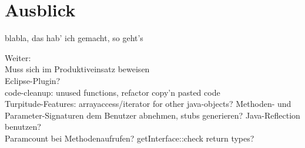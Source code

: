 \chapter{Ausblick}
\label{sec:extro}
blabla, das hab' ich gemacht, so geht's

Weiter: \\
Muss sich im Produktiveinsatz beweisen\\
Eclipse-Plugin?\\
code-cleanup: unused functions, refactor copy'n pasted code\\
Turpitude-Features: arrayaccess/iterator for other java-objects? 
Methoden- und Parameter-Signaturen dem Benutzer abnehmen, stubs generieren? Java-Reflection benutzen?\\
Paramcount bei Methodenaufrufen? getInterface::check return types?\\




